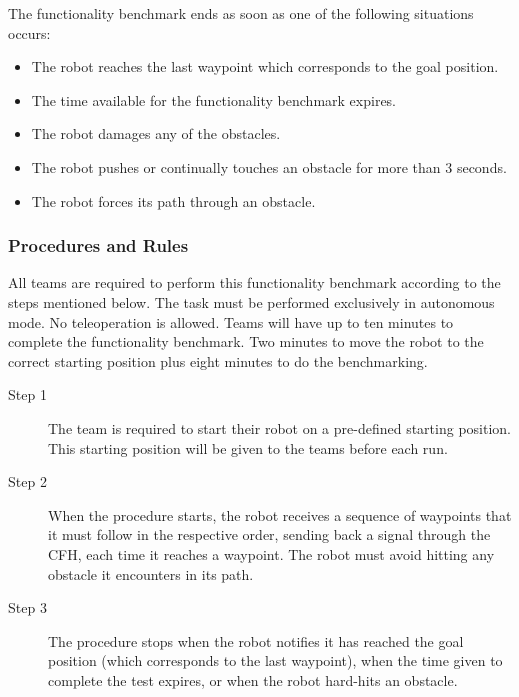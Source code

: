 The functionality benchmark ends as soon as one of the following situations occurs:
\begin{itemize}
  \item The robot reaches the last waypoint which corresponds to the goal position. 
  \item The time available for the functionality benchmark expires.
  \item The robot damages any of the obstacles.
  \item The robot pushes or continually touches an obstacle for more than 3 seconds.
  \item The robot forces its path through an obstacle.
\end{itemize}

\subsubsection{Procedures and Rules}
\label{sssec:FooOMProcedures}
All teams are required to perform this functionality benchmark according to the steps mentioned below. The task must be performed exclusively in autonomous mode. No teleoperation is allowed. Teams will have up to ten minutes to complete the functionality benchmark. Two minutes to move the robot to the correct starting position plus eight minutes to do the benchmarking.

\begin{description}
  \item [Step 1] The team is required to start their robot on a pre-defined starting position. This starting position will be given to the teams before each run.
  \item [Step 2] When the procedure starts, the robot receives a sequence of waypoints that it must follow in the respective order, sending back a signal through the CFH, each time it reaches a waypoint. The robot must avoid hitting any obstacle it encounters in its path.
  \item [Step 3] The procedure stops when the robot notifies it has reached the goal position (which corresponds to the last waypoint), when the time given to complete the test expires, or when the robot hard-hits an obstacle.
\end{description}


